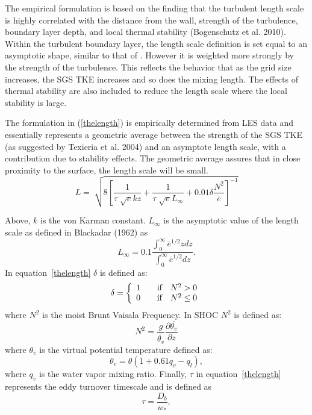 The empirical formulation is based on the finding that the turbulent length scale is highly correlated with the distance from the wall, strength of the turbulence, boundary layer depth, and local thermal stability (Bogenschutz et al. 2010).  Within the turbulent boundary layer, the length scale definition is set equal to an asymptotic shape, similar to that of \cite{Blackadar_62}.  However it is weighted more strongly by the strength of the turbulence.  This reflects the behavior that as the grid size increases, the SGS TKE increases and so does the mixing length.  The effects of thermal stability are also included to reduce the length scale where the local stability is large.  

The formulation in (\ref{thelength}) is empirically determined from LES data and essentially represents a geometric average between the strength of the SGS TKE (as suggested by Texieria et al. 2004) and an asymptote length scale, with a contribution due to stability effects.  The geometric average assures that in close proximity to the surface, the length scale will be small.  
%
\begin{equation}
  L=\sqrt[]{8\left[\frac{1}{\tau\sqrt[]{e}kz}+\frac{1}{\tau\sqrt[]{e}L_{\infty}}+0.01\delta\frac{N^{2}}{\overline{e}}\right]^{-1}}
  \label{thelength}
\end{equation}

Above, $k$ is the von Karman constant.  $L_{\infty}$ is the asymptotic value of the length scale as defined in Blackadar (1962) as
%
 \begin{equation}
  L_{\infty}=0.1\frac{\int_{0}^{\infty}\overline{e}^{1/2}z dz}{\int_{0}^{\infty} \overline{e}^{1/2} dz}. 
  \end{equation}
   In equation~\ref{thelength} $\delta$ is defined as:
\[
\delta = \left\{ 
\begin{array}{l l}
  1 & \quad \text{if} \quad N^{2} > 0 \\
  0 & \quad \text{if} \quad N^{2} \le 0 \\
\end{array} \right.
\]     
%
where $N^{2}$ is the moist Brunt Vaisala Frequency.  In SHOC $N^{2}$ is defined as:
%
\begin{equation}
  N^{2} = \frac{g}{\overline{\theta_{v}}}\frac{\partial{\overline{\theta_{v}}}}{\partial{z}}
  \label{brunt}
\end{equation}
%
where $\theta_{v}$ is the virtual potential temperature defined as:
%
\begin{equation}
  \theta_{v}=\theta(1 + 0.61q_{v} - q_{l}) , 
  \label{thetav}
\end{equation}
%
where $q_{v}$ is the water vapor mixing ratio. 
%
Finally, $\tau$ in equation~\ref{thelength} represents the eddy turnover timescale and is defined as
%
\begin{equation}
  \tau = \frac{D_{b}}{w_{*}},
  \label{conv_scale}
\end{equation} 

